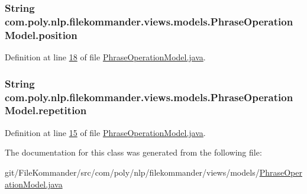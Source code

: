 \hypertarget{classcom_1_1poly_1_1nlp_1_1filekommander_1_1views_1_1models_1_1_phrase_operation_model_adb4ce1401274c126993693e673a8be5c}{
\subsubsection[{position}]{\setlength{\rightskip}{0pt plus 5cm}String com.\-poly.\-nlp.\-filekommander.\-views.\-models.\-Phrase\-Operation\-Model.\-position\hspace{0.3cm}{\ttfamily [private]}}}\label{classcom_1_1poly_1_1nlp_1_1filekommander_1_1views_1_1models_1_1_phrase_operation_model_adb4ce1401274c126993693e673a8be5c}


Definition at line \hyperlink{L18}{18} of file \hyperlink{}{Phrase\-Operation\-Model.\-java}.

\hypertarget{classcom_1_1poly_1_1nlp_1_1filekommander_1_1views_1_1models_1_1_phrase_operation_model_a7347d617c39bc105626f1a1bcee12f1e}{
\subsubsection[{repetition}]{\setlength{\rightskip}{0pt plus 5cm}String com.\-poly.\-nlp.\-filekommander.\-views.\-models.\-Phrase\-Operation\-Model.\-repetition\hspace{0.3cm}{\ttfamily [private]}}}\label{classcom_1_1poly_1_1nlp_1_1filekommander_1_1views_1_1models_1_1_phrase_operation_model_a7347d617c39bc105626f1a1bcee12f1e}


Definition at line \hyperlink{L15}{15} of file \hyperlink{}{Phrase\-Operation\-Model.\-java}.



The documentation for this class was generated from the following file\-:\begin{DoxyCompactItemize}
\item 
git/\-File\-Kommander/src/com/poly/nlp/filekommander/views/models/\hyperlink{_phrase_operation_model_8java}{Phrase\-Operation\-Model.\-java}\end{DoxyCompactItemize}
